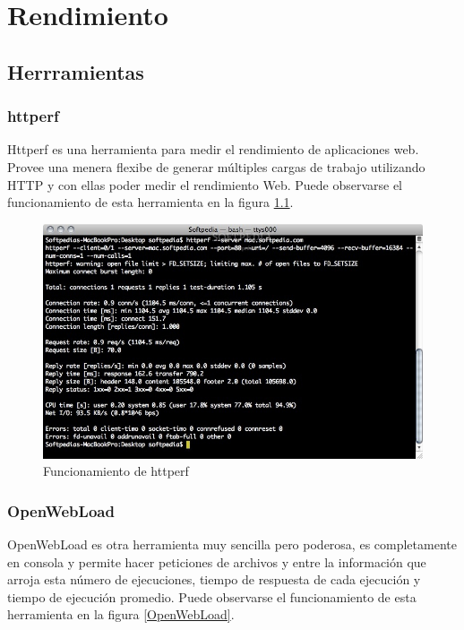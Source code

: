 
\chapter{Rendimiento} %

\label{ch:rendimiento} %


\section{Herrramientas}


\subsection{httperf}

Httperf es una herramienta para medir el rendimiento de aplicaciones web. Provee una menera flexibe de generar múltiples cargas de trabajo utilizando HTTP y con ellas poder medir el rendimiento Web. Puede observarse el funcionamiento de esta herramienta en la figura \ref{httperf}.

\begin{figure}[h]
  \centering
    \includegraphics[scale=0.4]{gfx/httperf}
  \caption{Funcionamiento de httperf}
  \label{httperf}
\end{figure}

\subsection{OpenWebLoad}
OpenWebLoad es otra herramienta muy sencilla pero poderosa, es completamente en consola y permite hacer peticiones de archivos y entre la información que arroja esta número de ejecuciones, tiempo de respuesta de cada ejecución y tiempo de ejecución promedio. Puede observarse el funcionamiento de esta herramienta en la figura \ref{OpenWebLoad}.

